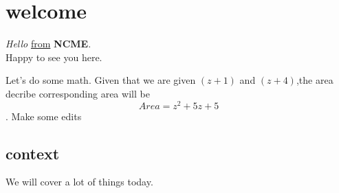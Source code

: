 \documentclass[11pt]{article}
\begin{document}
\section{welcome}
\textit{Hello} \underline{from} \textbf{NCME}. \\
Happy to see you here.

Let's do some math. Given that we are given $(z+1)$ and $(z+4)$,the area decribe corresponding area will be $$Area=z^2+5z+5$$. Make some edits
 
\subsection[10]{context}
 We will cover a lot of things today.
\end{document}
